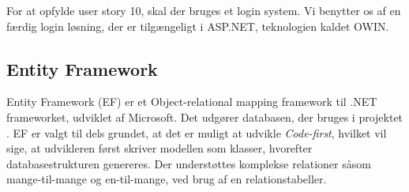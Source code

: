 For at opfylde user story  10, skal der bruges et login system.
Vi benytter os af en færdig login løsning, der er tilgængeligt i ASP.NET, teknologien kaldet OWIN.

\subsection{Entity Framework}
Entity Framework (EF) er et Object-relational mapping framework til .NET frameworket, udviklet af Microsoft.
Det udgører databasen, der bruges i projektet \citep{EF}.
EF er valgt til dels grundet, at det er muligt at udvikle \textit{Code-first}, hvilket vil sige, at udvikleren først skriver modellen som klasser, hvorefter databasestrukturen genereres.
Der understøttes komplekse relationer såsom mange-til-mange og en-til-mange, ved brug af en relationstabeller.
